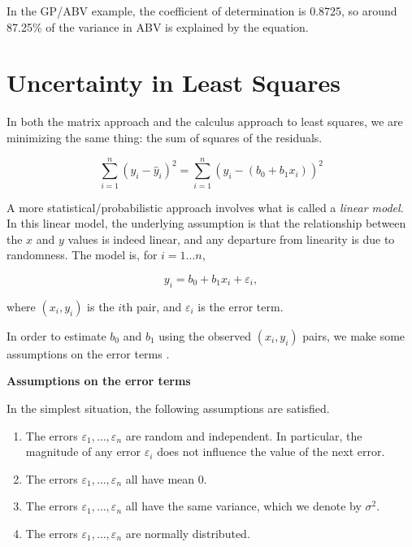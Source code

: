 \documentclass[
]{book}
\theoremstyle{definition}
\theoremstyle{definition}
\theoremstyle{definition}
\theoremstyle{definition}
\theoremstyle{remark}
\begin{document}
In the GP/ABV example, the coefficient of determination is 0.8725, so around 87.25\% of the variance in ABV is explained by the equation.

\section{Uncertainty in Least Squares}\label{uncertainty-in-least-squares}

In both the matrix approach and the calculus approach to least squares, we are minimizing the same thing: the sum of squares of the residuals.

\begin{equation*}
\sum_{i=1}^n(y_i-\hat{y}_i)^2=\sum_{i=1}^n(y_i-(b_0+b_1x_i))^2
\end{equation*}

A more statistical/probabilistic approach involves what is called a \emph{linear model}. In this linear model, the underlying assumption is that the relationship between the \(x\) and \(y\) values is indeed linear, and any departure from linearity is due to randomness. The model is, for \(i=1\dots n\),

\[y_i=b_0+b_1x_i+\varepsilon_i,\]

where \((x_i,y_i)\) is the \(i\)th pair, and \(\varepsilon_i\) is the error term.

In order to estimate \(b_0\) and \(b_1\) using the observed \((x_i,y_i)\) pairs, we make some assumptions on the error terms \autocite{Navidi}.

\begin{propbox}

\textbf{Assumptions on the error terms}

In the simplest situation, the following assumptions are satisfied.

\begin{enumerate}
\def\labelenumi{\arabic{enumi}.}
\item
  The errors \(\varepsilon_1,\dots,\varepsilon_n\) are random and independent. In particular, the magnitude of any error \(\varepsilon_i\) does not influence the value of the next error.
\item
  The errors \(\varepsilon_1,\dots,\varepsilon_n\) all have mean 0.
\item
  The errors \(\varepsilon_1,\dots,\varepsilon_n\) all have the same variance, which we denote by \(\sigma^2\).
\item
  The errors \(\varepsilon_1,\dots,\varepsilon_n\) are normally distributed.
\end{enumerate}

\end{propbox}
\end{document}
